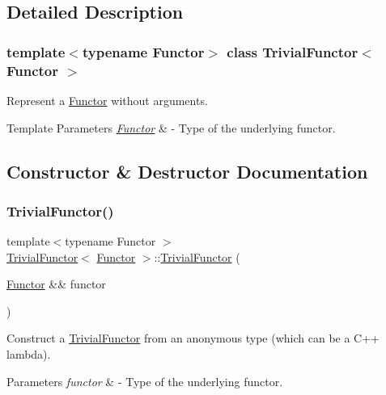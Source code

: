 \subsection{Detailed Description}
\subsubsection*{template$<$typename Functor$>$\newline
class Trivial\+Functor$<$ Functor $>$}

Represent a \mbox{\hyperlink{class_functor}{Functor}} without arguments. 
\begin{DoxyTemplParams}{Template Parameters}
{\em \mbox{\hyperlink{class_functor}{Functor}}} & -\/ Type of the underlying functor. \\
\hline
\end{DoxyTemplParams}


\subsection{Constructor \& Destructor Documentation}
\mbox{\label{class_trivial_functor_ab5798bb2ea9fcdb5bf910662ac49c34c}} 
\subsubsection{\texorpdfstring{Trivial\+Functor()}{TrivialFunctor()}}
{\footnotesize\ttfamily template$<$typename Functor $>$ \\
\mbox{\hyperlink{class_trivial_functor}{Trivial\+Functor}}$<$ \mbox{\hyperlink{class_functor}{Functor}} $>$\+::\mbox{\hyperlink{class_trivial_functor}{Trivial\+Functor}} (\begin{DoxyParamCaption}\item[{\mbox{\hyperlink{class_functor}{Functor}} \&\&}]{functor }\end{DoxyParamCaption})}

Construct a \mbox{\hyperlink{class_trivial_functor}{Trivial\+Functor}} from an anonymous type (which can be a C++ lambda). 
\begin{DoxyParams}{Parameters}
{\em functor} & -\/ Type of the underlying functor. \\
\hline
\end{DoxyParams}


